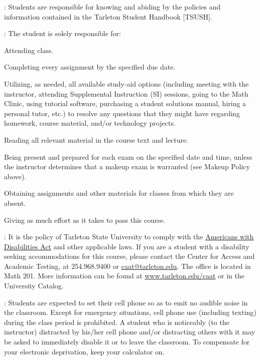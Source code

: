 \documentclass[letterpaper]{article}
\begin{document}
: Students are responsible for knowing and abiding by the policies and information contained in the Tarleton Student Handbook [TSUSH].

:  The student is solely responsible for:
\bit
	\item	Attending class.
	\item Completing every assignment by the specified due date.
	\item Utilizing, as needed, all available study-aid options (including meeting with the instructor, attending Supplemental Instruction (SI) sessions, going to the Math Clinic, using tutorial software, purchasing a student solutions manual, hiring a personal tutor, etc.) to resolve any questions that they might have regarding homework, course material, and/or technology projects.
	\item	Reading all relevant material in the course text and lecture.
	\item	Being present and prepared for each exam on the specified date and time, unless the instructor determines that a makeup exam is warranted (see Makeup Policy above).
  \item Obtaining assignments and other materials for classes from which they are absent.
  \item Giving as much effort as it takes to pass this course.
\eit

: It is the policy of Tarleton State University to comply with the \href{http://www.ada.gov}{\underline{Americans with Disabilities Act}} and other applicable laws. If you are a student with a disability seeking accommodations for this course, please contact the Center for Access and Academic Testing, at 254.968.9400 or \href{mailto:caat@tarleton.edu}{\underline{caat@tarleton.edu}}. The office is located in Math 201. More information can be found at \href{http://www.tarleton.edu/caat}{\underline{www.tarleton.edu/caat}} or in the University Catalog.


: Students are expected to set their cell phone so as to emit no audible noise in the classroom. Except for emergency situations, cell phone use (including texting) during the class period is prohibited. A student who is noticeably (to the instructor) distracted by his/her cell phone and/or distracting others with it may be asked to immediately disable it or to leave the classroom.  To compensate for your electronic deprivation, keep your calculator on.
\end{document}
